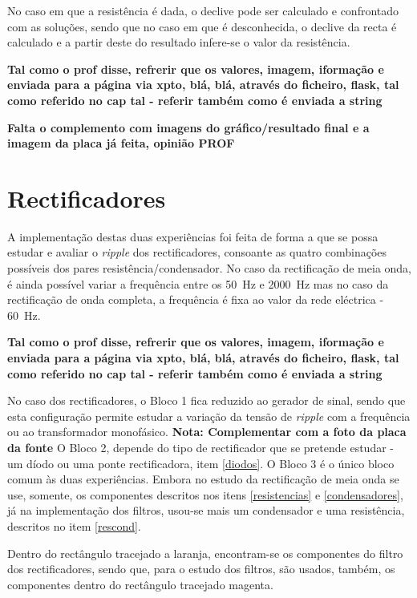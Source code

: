 No caso em que a resistência é dada, o declive pode ser calculado e confrontado com as soluções, sendo que no caso em que é desconhecida, o declive da recta é calculado e a partir deste do resultado infere-se o valor da resistência. 

\textbf{Tal como o prof disse, refrerir que os valores, imagem, iformação e enviada para a página via xpto, blá, blá, através do ficheiro, flask, tal como referido no cap tal - referir também como é enviada a string}

\textbf{Falta o complemento com imagens do gráfico/resultado final e a imagem da placa já feita, opinião PROF}


\section{Rectificadores}
A implementação destas duas experiências foi feita de forma a que se possa estudar e avaliar o \textit{ripple} dos rectificadores, consoante as quatro combinações possíveis dos pares resistência/condensador. No caso da rectificação de meia onda, é ainda possível variar a frequência entre os \SI{50}{\hertz} e \SI{2000}{\hertz} mas no caso da rectificação de onda completa, a frequência é fixa ao valor da rede eléctrica - \SI{60}{\hertz}.

\textbf{Tal como o prof disse, refrerir que os valores, imagem, iformação e enviada para a página via xpto, blá, blá, através do ficheiro, flask, tal como referido no cap tal - referir também como é enviada a string}

No caso dos rectificadores, o Bloco 1 fica reduzido ao gerador de sinal, sendo que esta configuração permite estudar a variação da tensão de \textit{ripple} com a frequência ou ao transformador monofásico. \textbf{Nota: Complementar com a foto da placa da fonte} O Bloco 2, depende do tipo de rectificador que se pretende estudar - um díodo ou uma ponte rectificadora, item \ref{diodos}. O Bloco 3 é o único bloco comum às duas experiências. Embora no estudo da rectificação de meia onda se use, somente, os componentes descritos nos itens \ref{resistencias} e \ref{condensadores}, já na implementação dos filtros, usou-se mais um condensador e uma resistência, descritos no item \ref{rescond}. 

Dentro do rectângulo tracejado a laranja, encontram-se os componentes do filtro dos rectificadores, sendo que, para o estudo dos filtros, são usados, também, os componentes dentro do rectângulo tracejado magenta.



